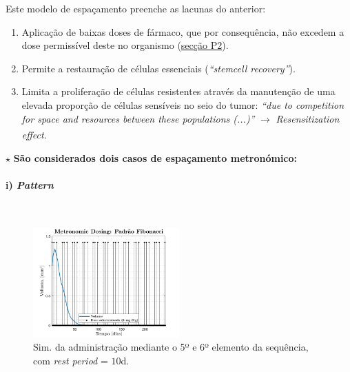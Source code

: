Este modelo de espaçamento preenche as lacunas do anterior:

\vphantom{esperiencia123}
\begin{enumerate}
    \itemsep 0em 
    \vspace{0em}\item Aplicação de baixas doses de fármaco, que por consequência, não excedem a dose permissível deste no organismo (\hyperref[subsec:P2]{secção P2}).
    \vspace{-0.5em}\item  Permite a restauração de células essenciais (\textit{``stemcell recovery''}\cite{Hahnfeldt2003-oy}).
    \vspace{-0.5em}\item  Limita a proliferação de células resistentes através da manutenção de uma elevada proporção de células sensíveis no seio do tumor: \textit{``due to competition for space and resources between these populations (...)''}\cite{elisa_2017}  $\xrightarrow[]{}$ \textit{Resensitization effect}\cite{Hahnfeldt2003-oy}.
\end{enumerate}

\vspace{-0.5em}
\noindent $\pmb{\star}$ \textbf{São considerados dois casos de espaçamento metronómico:}

\vspace{-1.5em}\paragraph{i) \textit{Pattern}}\mbox{}\\
\label{subsubsubsec:pattern}
\vspace{-2.5em}
\hspace*{-0cm}\begin{figure}
    \centering
    \includegraphics[width=0.5\textwidth]{img/perguntas/P5/P5-pattern.png}
    \begin{minipage}{2\linewidth}
        \caption{Sim. da administração mediante o 5º e 6º elemento da sequência, com \textit{rest period} = $10$d.}
        \label{fig:P5-pattern}
    \end{minipage}
\end{figure}

